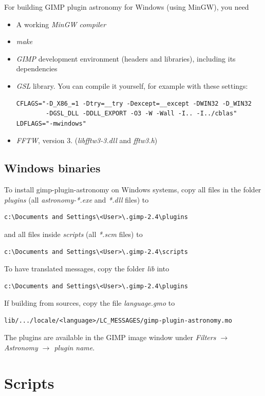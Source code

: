 \documentclass[a4paper]{article}
\begin{document}
For building GIMP plugin astronomy for Windows (using MinGW), you need
\begin{itemize}
\item A working \emph{MinGW compiler}
\item \emph{make}
\item \emph{GIMP} development environment (headers and libraries), including its dependencies
\item \emph{GSL} library. You can compile it yourself, for example with these settings:
\begin{verbatim}
CFLAGS="-D_X86_=1 -Dtry=__try -Dexcept=__except -DWIN32 -D_WIN32
        -DGSL_DLL -DDLL_EXPORT -O3 -W -Wall -I.. -I../cblas"
LDFLAGS="-mwindows"
\end{verbatim}
\item \emph{FFTW}, version 3. (\emph{libfftw3-3.dll} and \emph{fftw3.h})
\end{itemize}


\subsection{Windows binaries}

To install gimp-plugin-astronomy on Windows systems, copy all files in the folder \emph{plugins} (all \emph{astronomy-*.exe} and \emph{*.dll} files) to
\begin{verbatim}c:\Documents and Settings\<User>\.gimp-2.4\plugins\end{verbatim}
and all files inside \emph{scripts} (all \emph{*.scm} files) to
\begin{verbatim}c:\Documents and Settings\<User>\.gimp-2.4\scripts\end{verbatim}
To have translated messages, copy the folder \emph{lib} into
\begin{verbatim}c:\Documents and Settings\<User>\.gimp-2.4\plugins\end{verbatim}
If building from sources, copy the file \emph{language.gmo} to
\begin{verbatim}lib/.../locale/<language>/LC_MESSAGES/gimp-plugin-astronomy.mo\end{verbatim}
The plugins are available in the GIMP image window under \emph{Filters $\rightarrow$ Astronomy $\rightarrow$ plugin name}.

\newpage

\section{Scripts}
\end{document}

